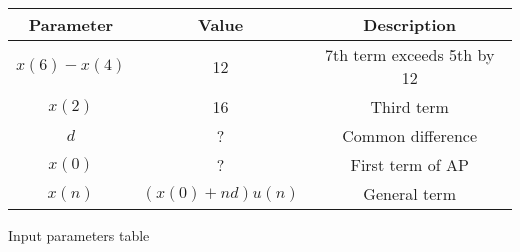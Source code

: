 
\centering
\begin{tabular}{|c|c|c|}
        \hline
        \textbf{Parameter} & \textbf{Value} & \textbf{Description} \\
        \hline
        $x(6) - x(4)$ & 12 & 7th term exceeds 5th by 12 \\
        \hline
	$x(2)$ & 16 & Third term \\
	\hline
        $d$ & ? & Common difference \\
        \hline
        $x(0)$ & ? & First term of AP \\
	\hline
        $x(n)$ & $(x(0) + nd)u(n)$ & General term \\
        \hline
\end{tabular}
\caption{Input parameters table}
\label{tab:1}
